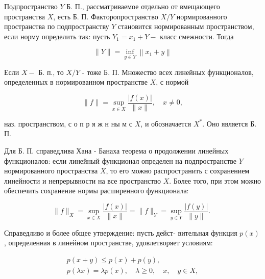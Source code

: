 \documentclass[10pt]{article}
\begin{document}
Подпространство $Y$ Б. П., рассматриваемое отдельно от вмещающего пространства $X$, есть Б. П. Факторопространство $X / Y$ нормированного пространства по подпространству $Y$ становится нормированным пространством, если норму определить так: пусть $Y_{1}=x_{1}+Y-$ класс смежности. Тогда



\[

\|Y\|=\inf _{y \in Y}\left\|x_{1}+y\right\|

\]



Если $X-$ Б. п., то $X / Y$ - тоже Б. П. Множество всех линейных функционалов, определенных в нормированном пространстве $X$, с нормой



\[

\|f\|=\sup _{x \in X} \frac{|f(x)|}{\|x\|}, \quad x \neq 0,

\]



наз. пространством, с о п р я ж н ны м с $X$, и обозначается $X^{*}$. Оно является Б. П.



Для Б. П. справедлива Хана - Банаха теорема о продолжении линейных функционалов: если линейный функционал определен на подпространстве $Y$ нормированного пространства $X$, то его можно распространить с сохранением линейности и непрерывности на все пространство $X$. Более того, при этом можно обеспечить сохранение нормы расширенного функционала:



\[

\|f\|_{X}=\sup _{x \in X} \frac{|f(x)|}{\|x\|}=\|f\|_{Y}=\sup _{y \in Y} \frac{|f(y)|}{\|y\|} \text {. }

\]



Справедливо и более общее утверждение: пусть дейст- вительная функция $p(x)$, определенная в линейном пространстве, удовлетворяет условиям:



\[

\begin{gathered}

p(x+y) \leqslant p(x)+p(y), \\

p(\lambda x)=\lambda p(x), \quad \lambda \geqslant 0, \quad x, \quad y \in X,

\end{gathered}

\]
\end{document}
